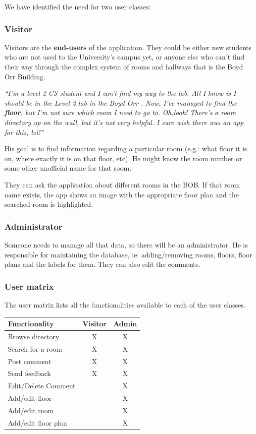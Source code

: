 \documentclass{sig-alt-release2}
\begin{document}
We have identified the need for two user classes:

\subsubsection*{Visitor}
Visitors are the \textbf{end-users} of the application. They could be either
new students who are not used to the University's campus yet, or anyone else
who can't find their way through the complex system of rooms and hallways that
is the Boyd Orr Building.

\emph{``I'm a level 2 CS student and I can't find my way to the lab. All 
I know is I should be in the \guillemotleft Level 2 lab in the Boyd Orr
\guillemotright. Now, I've managed to find the \textbf{floor}, but I'm not sure
which room I need to go to. Oh,look! There's a room directory up on the wall, 
but it's not very helpful. I sure wish there was an app for this, lol!''}

His goal is to find information regarding a particular room (e.g.: what floor 
it is on, where exactly it is on that floor, etc). He might know the room 
number or some other unofficial name for that room.

They can ask the application about different rooms in the BOB. If that room 
name exists, the app shows an image with the appropriate floor plan and the 
searched room is highlighted.

\subsubsection*{Administrator}
Someone needs to manage all that data, so there will be an administrator. He is
responsible for maintaining the database, ie: adding/removing rooms, floors,
floor plans and the labels for them. They can also edit the comments.

\subsubsection*{User matrix}
The user matrix lists all the functionalities available to each of the user
classes.

\begin{tabular}{| p{4cm} | c | c |} \hline
\textbf{Functionality} & \textbf{Visitor} & \textbf{Admin} \\ \hline
Browse directory & X & X \\ \hline
Search for a room & X & X \\ \hline
Post comment & X & X \\ \hline
Send feedback & X & X \\ \hline
Edit/Delete Comment & & X \\ \hline
Add/edit floor &  & X \\ \hline
Add/edit room & & X \\ \hline
Add/edit floor plan & & X \\ \hline
\end{tabular}	
\end{document}
